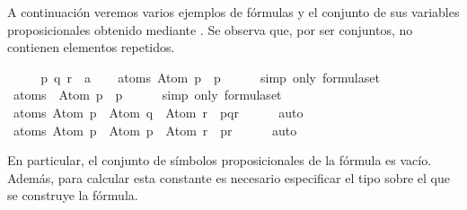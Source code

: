 \begin{isabellebody}
\begin{isamarkuptext}
  A continuación veremos varios ejemplos de fórmulas y el conjunto de 
  sus variables proposicionales obtenido mediante . Se 
  observa que, por ser conjuntos, no contienen elementos repetidos.%
\end{isamarkuptext}\isamarkuptrue%
\isamarkupfalse%
\ \isanewline
{}\isanewline
%
\isadelimproof
\ \ %
\endisadelimproof
%
\isatagproof
{}\isamarkupfalse%
\ p\ q\ r\ {\isacharcolon}{\isacharcolon}\ {\isacharprime}a\isanewline
\isanewline
\ \ \isamarkupfalse%
\ {\isachardoublequoteopen}atoms\ {\isacharparenleft}Atom\ p{\isacharparenright}\ {\isacharequal}\ {\isacharbraceleft}p{\isacharbraceright}{\isachardoublequoteclose}\isanewline
\ \ \ \ \isamarkupfalse%
\ {\isacharparenleft}simp\ only{\isacharcolon}\ formula{\isachardot}set{\isacharparenright}\isanewline
\isanewline
\ \ \isamarkupfalse%
\ {\isachardoublequoteopen}atoms\ {\isacharparenleft}\isactrlbold {\isasymnot}\ {\isacharparenleft}Atom\ p{\isacharparenright}{\isacharparenright}\ {\isacharequal}\ {\isacharbraceleft}p{\isacharbraceright}{\isachardoublequoteclose}\isanewline
\ \ \ \ \isamarkupfalse%
\ {\isacharparenleft}simp\ only{\isacharcolon}\ formula{\isachardot}set{\isacharparenright}\isanewline
\isanewline
\ \ \isamarkupfalse%
\ {\isachardoublequoteopen}atoms\ {\isacharparenleft}{\isacharparenleft}Atom\ p\ \isactrlbold {\isasymrightarrow}\ Atom\ q{\isacharparenright}\ \isactrlbold {\isasymor}\ Atom\ r{\isacharparenright}\ {\isacharequal}\ {\isacharbraceleft}p{\isacharcomma}q{\isacharcomma}r{\isacharbraceright}{\isachardoublequoteclose}\isanewline
\ \ \ \ \isamarkupfalse%
\ auto\isanewline
\isanewline
\ \ \isamarkupfalse%
\ {\isachardoublequoteopen}atoms\ {\isacharparenleft}{\isacharparenleft}Atom\ p\ \isactrlbold {\isasymrightarrow}\ Atom\ p{\isacharparenright}\ \isactrlbold {\isasymor}\ Atom\ r{\isacharparenright}\ {\isacharequal}\ {\isacharbraceleft}p{\isacharcomma}r{\isacharbraceright}{\isachardoublequoteclose}\isanewline
\ \ \ \ \isamarkupfalse%
\ auto%
\endisatagproof
{\isafoldproof}%
%
\isadelimproof
\ \ \isanewline
%
\endisadelimproof
{}\isamarkupfalse%
%
\begin{isamarkuptext}%
En particular, el conjunto de símbolos proposicionales de la 
  fórmula  es vacío. Además, para calcular esta constante es 
  necesario especificar el tipo sobre el que se construye la fórmula.%
\end{isamarkuptext}\isamarkuptrue%

\end{isabellebody}
